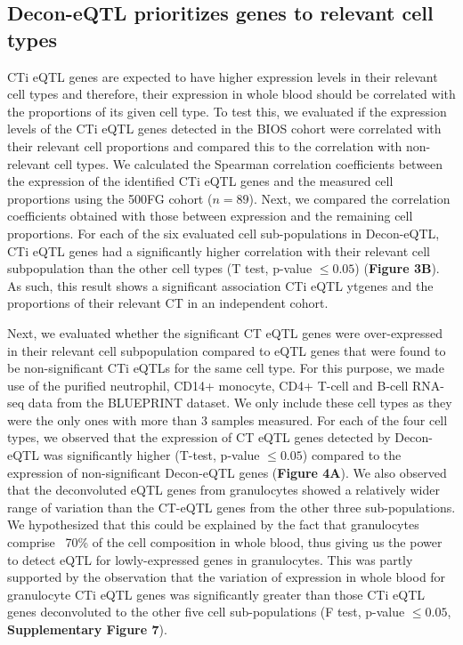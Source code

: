 \subsection{Decon-eQTL prioritizes genes to relevant cell types}
CTi eQTL genes are expected to have higher expression levels in their relevant cell types and therefore, their expression in whole blood should be correlated with the proportions of its given cell type. To test this, we evaluated if the expression levels of the CTi eQTL genes detected in the BIOS cohort were correlated with their relevant cell proportions and compared this to the correlation with non-relevant cell types. We calculated the Spearman correlation coefficients between the expression of the identified CTi eQTL genes and the measured cell proportions using the 500FG cohort ($n = 89$). Next, we compared the correlation coefficients obtained with those between expression and the remaining cell proportions. For each of the six evaluated cell sub-populations in Decon-eQTL, CTi eQTL genes had a significantly higher correlation with their relevant cell subpopulation than the other cell types (T test, p-value $\leq 0.05$) (\textbf{Figure 3B}). As such, this result shows a significant association CTi eQTL ytgenes and the proportions of their relevant CT in an independent cohort.

Next, we evaluated whether the significant CT eQTL genes were over-expressed in their relevant cell subpopulation compared to eQTL genes that were found to be non-significant CTi eQTLs for the same cell type. For this purpose, we made use of the purified neutrophil, CD14+ monocyte, CD4+ T-cell and B-cell RNA-seq data from the BLUEPRINT dataset. We only include these cell types as they were the only ones with more than 3 samples measured. For each of the four cell types, we observed that the expression of CT eQTL genes detected by Decon-eQTL was significantly higher (T-test, p-value $\leq 0.05$) compared to the expression of non-significant Decon-eQTL genes (\textbf{Figure 4A}). We also observed that the deconvoluted eQTL genes from granulocytes showed a relatively wider range of variation than the CT-eQTL genes from the other three sub-populations. We hypothesized that this could be explained by the fact that granulocytes comprise ~70\% of the cell composition in whole blood, thus giving us the power to detect eQTL for lowly-expressed genes in granulocytes. This was partly supported by the observation that the variation of expression in whole blood for granulocyte CTi eQTL genes was significantly greater than those CTi eQTL genes deconvoluted to the other five cell sub-populations (F test, p-value $\leq 0.05$, \textbf{Supplementary Figure 7}). 

